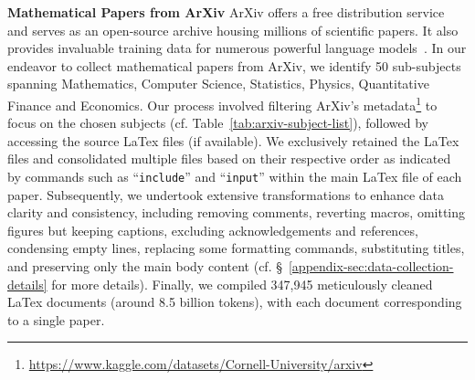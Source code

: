 \textbf{Mathematical Papers from ArXiv} \quad ArXiv offers a free distribution service and serves as an open-source archive housing  millions of scientific papers. It also provides  invaluable training data for numerous powerful language models~\citep[][\emph{inter alia}]{DBLP:journals/corr/abs-2302-13971-llama,RedPajama}. In our endeavor to collect mathematical papers from ArXiv, we identify 50 sub-subjects spanning Mathematics, Computer Science, Statistics, Physics, Quantitative Finance and Economics. Our process involved filtering ArXiv's metadata\footnote{\url{https://www.kaggle.com/datasets/Cornell-University/arxiv}} to focus on the chosen subjects (cf. Table~\ref{tab:arxiv-subject-list}), followed by accessing the source LaTex files (if available). We exclusively retained the LaTex files and consolidated multiple files based on their respective order as indicated by commands such as ``\texttt{include}'' and ``\texttt{input}'' within the main LaTex file of each paper. Subsequently, we undertook extensive transformations to enhance data clarity and consistency, including removing comments, reverting macros, omitting figures but keeping captions, excluding acknowledgements and references, condensing empty lines, replacing some formatting commands, substituting titles, and preserving only the main body content (cf. \S~\ref{appendix-sec:data-collection-details} for more details). Finally, we compiled 347,945 meticulously cleaned LaTex documents (around 8.5 billion tokens), with each document corresponding to a single paper. 

